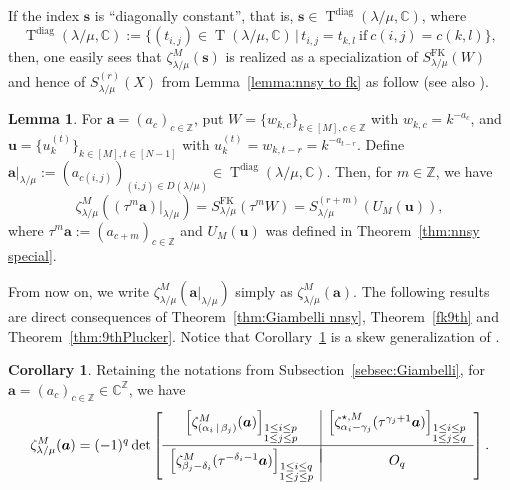 \documentclass[12pt]{amsart}%
\theoremstyle{definition}
\newtheorem{cor}[theorem]{Corollary}
\newtheorem{lemma}[theorem]{Lemma}
\DeclareMathOperator{\diag}{diag}
\DeclareMathOperator{\T}{T}
\newcommand{\ba}{\boldsymbol a}
\newcommand{\bs}{\boldsymbol s}
\newcommand{\bu}{\boldsymbol u}
\newcommand{\FK}{\mathrm{FK}}
\begin{document}
If the index $\bs$ is ``diagonally constant'', that is, 
$\bs\in \T^{\diag}(\lambda/\mu,\mathbb{C})$, where 
\[
\T^{\diag}(\lambda/\mu,\mathbb{C})
:=\{(t_{i,j})\in \T(\lambda/\mu,\mathbb{C})\,|\,t_{i,j}=t_{k,l} \ {\mathrm{if}} \ c(i,j)=c(k,l)\},
\]
then, one easily sees that 
$\zeta^{M}_{\lambda/\mu}(\bs)$ is realized as a specialization of $S^{\FK}_{\lambda/\mu}(W)$ and hence 
of $S^{(r)}_{\lambda/\mu}(X)$ from Lemma~\ref{lemma:nnsy to fk} as follow
(see also \cite[Lemma~4.2]{npy}).

\begin{lemma}
For $\ba=(a_c)_{c\in\mathbb{Z}}$, 
put $W=\{w_{k,c}\}_{k\in [M], c\in\mathbb{Z}}$ 
with $w_{k,c}=k^{-a_c}$, 
and $\bu=\{u^{(t)}_k\}_{k\in [M],t\in [N-1]}$ 
with $u^{(t)}_k=w_{k,t-r}=k^{-a_{t-r}}$.
Define $\ba|_{\lambda/\mu}:=(a_{c(i,j)})_{(i,j)\in D(\lambda/\mu)}\in \T^{\diag}(\lambda/\mu,\mathbb{C})$.
Then, for $m\in\mathbb{Z}$, we have 
\[
\zeta^{M}_{\lambda/\mu}((\tau^m\ba)|_{\lambda/\mu})
=S^{\FK}_{\lambda/\mu}(\tau^m W)
=S^{(r+m)}_{\lambda/\mu}(U_M(\bu)),
\]
where $\tau^m\ba:=(a_{c+m})_{c\in\mathbb{Z}}$ and $U_M(\bu)$ was defined in Theorem~\ref{thm:nnsy special}.
\end{lemma}

From now on, we write $\zeta^{M}_{\lambda/\mu}(\ba|_{\lambda/\mu})$ simply as $\zeta^{M}_{\lambda/\mu}(\ba)$.
The following results are direct consequences of
Theorem~\ref{thm:Giambelli nnsy}, Theorem~\ref{fk9th} and Theorem~\ref{thm:9thPlucker}.
Notice that Corollary~\ref{cor:Schur skew Giambelli} is a skew generalization of \cite[Theorem~4.5]{npy}.

\begin{cor}
\label{cor:Schur skew Giambelli}
Retaining the notations from  Subsection~\ref{sebsec:Giambelli},
for $\ba=(a_c)_{c\in\mathbb{Z}}\in\mathbb{C}^{\mathbb{Z}}$, we have
\begin{equation}
\label{for:Schur zeta skew Giambelli}
 \zeta^{M}_{\lambda/\mu}(\ba)
=(-1)^q\det 
\left[
\begin{array}{c|c}
\left[\zeta^{M}_{(\alpha_i\,|\,\beta_j)}(\ba)\right]_{\substack{1\le i\le p \\ 1\le j\le p}} & 
\left[\zeta^{\star,M}_{\alpha_i-\gamma_j}(\tau^{\gamma_j+1}\ba)\right]_{\substack{1\le i\le p \\ 1\le j\le q}} \\[10pt]
\hline \\[-10pt]
 \left[\zeta^{M}_{\beta_j-\delta_i}(\tau^{-\delta_i-1}\ba)\right]_{\substack{1\le i\le q \\ 1\le j\le p}} & O_{q}
\end{array}
\right].
\end{equation}
\end{cor}
\end{document}
